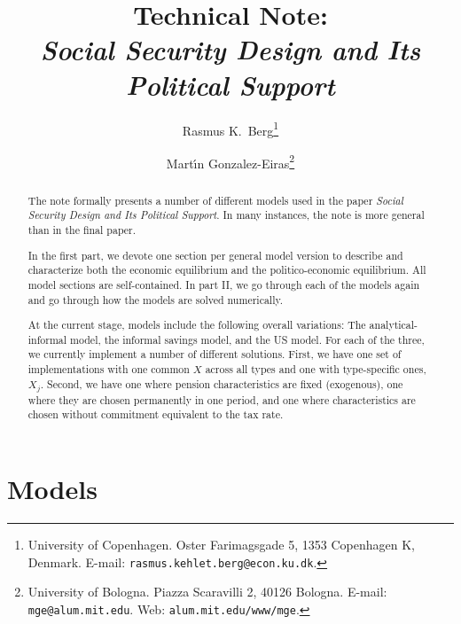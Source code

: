 \documentclass[a4paper]{article}
\begin{document}

\title{Technical Note: \\
\emph{Social Security Design and Its Political Support}}

\author{Rasmus K.\ Berg\thanks{University of Copenhagen. Oster Farimagsgade 5, 1353 Copenhagen K, Denmark. E-mail: \texttt{rasmus.kehlet.berg@econ.ku.dk}.}
\and
Mart\'{\i}n Gonzalez-Eiras\thanks{University of Bologna. Piazza Scaravilli 2, 40126 Bologna. E-mail: \texttt{mge@alum.mit.edu}. Web: \texttt{alum.mit.edu/www/mge}.}}
\maketitle


\begin{abstract}
\noindent
The note formally presents a number of different models used in the paper \textit{Social Security Design and Its Political Support}. In many instances, the note is more general than in the final paper.

In the first part, we devote one section per general model version to describe and characterize both the economic equilibrium and the politico-economic equilibrium. All model sections are self-contained. In part II, we go through each of the models again and go through how the models are solved numerically.


At the current stage, models include the following overall variations: The analytical-informal model, the informal savings model, and the US model. For each of the three, we currently implement a number of different solutions. First, we have one set of implementations with one common $X$ across all types and one with type-specific ones, $X_j$. Second, we have one where pension characteristics are fixed (exogenous), one where they are chosen permanently in one period, and one where characteristics are chosen without commitment equivalent to the tax rate.
\end{abstract}

\clearpage
\part{Models}\label{part:models}
\end{document}
